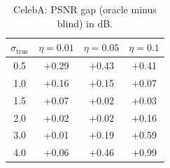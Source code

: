 \begin{table}[h]
\centering
\begin{tabular}{cccc}
\toprule
$\sigma_{\text{true}}$ & $\eta = 0.01$ & $\eta = 0.05$ & $\eta = 0.1$ \\
\midrule
0.5 & +0.29 & +0.43 & +0.41 \\
1.0 & +0.16 & +0.15 & +0.07 \\
1.5 & +0.07 & +0.02 & +0.03 \\
2.0 & +0.02 & +0.02 & +0.16 \\
3.0 & +0.01 & +0.19 & +0.59 \\
4.0 & +0.06 & +0.46 & +0.99 \\
\bottomrule
\end{tabular}
\caption{CelebA: PSNR gap (oracle minus blind) in dB.}
\label{tab:psnr_gap_celeba}
\end{table}
